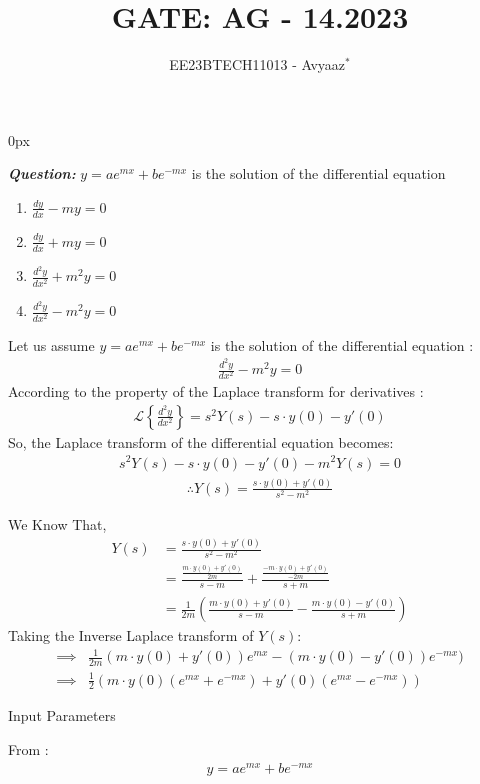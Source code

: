 \documentclass[journal,12pt,twocolumn]{IEEEtran}
\theoremstyle{remark}
\begin{document}
\parindent 0px

\vspace{3cm}

\title{GATE: AG - 14.2023}
\author{EE23BTECH11013 - Avyaaz$^{*}$%
}
\maketitle
\newpage
\bigskip

\renewcommand{\thefigure}{\arabic{figure}}
\renewcommand{\thetable}{\arabic{table}}
\large\textbf{\textsl{Question:}}
$y = ae^{mx} + be^{-mx}$ is the solution of the differential equation
\begin{enumerate}[label=\alph*)]
    \item $\frac{dy}{dx} - my = 0$
    \item $\frac{dy}{dx} + my = 0$
    \item $\frac{d^2y}{dx^2} + m^2y = 0$
    \item $\frac{d^2y}{dx^2} - m^2y = 0$
\end{enumerate}
\solution

Let us assume $y = ae^{mx} + be^{-mx}$ is the solution of the differential equation : 
\begin{align}
    \frac{d^2y}{dx^2} - m^2y = 0
\end{align}
According to the property of the Laplace transform for derivatives :
\begin{align}
    \mathcal{L}\left\{ \frac{d^2y}{dx^2} \right\} = s^2 Y(s) - s \cdot y(0) - y'(0)
\end{align}
So, the Laplace transform of the differential equation becomes:
\begin{align}
   s^2 Y(s) - s\cdot y(0) - y'(0) - m^2Y(s) = 0
   \end{align}
   \begin{align}
   \therefore Y(s) = \frac{s\cdot y(0) + y'(0)}{s^2 - m ^2}
\end{align}

We Know That,
\begin{align}
    Y(s) &= \frac{s\cdot y(0) + y'(0)}{s^2 - m ^2}\\
    &= \frac{\frac{m\cdot y(0) + y'(0)}{2m}}{s - m} + \frac{\frac{-m\cdot y(0) + y'(0)}{-2m}}{s + m}\\
    &=\frac{1}{2m}\left(\frac{m\cdot y(0) + y'(0)}{s - m} - \frac{m\cdot y(0) - y'(0)}{s + m}\right)
\end{align}
Taking the Inverse Laplace transform of $Y(s)$:
\begin{align}
 \implies& \frac{1}{2m} (m \cdot y(0) + y'(0)) e^{mx} - (m \cdot y(0) - y'(0)) e^{-mx} )\\
\implies &\frac{1}{2} \left( m \cdot y(0)(e^{mx} + e^{-mx}) + y'(0)(e^{mx} - e^{-mx}) \right)
\end{align}
 \begin{table}[htbp]
     \centering
     \setlength{\extrarowheight}{8pt}
    
     \caption{Input Parameters}
     \label{tab:table1.AG.14.2023}
 \end{table} 
 
From :
\begin{align}
    y = ae^{mx} + be^{-mx}
\end{align}

% 
\end{document}
